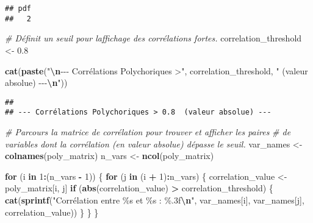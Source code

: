\documentclass[
]{article}
\newenvironment{Shaded}{\begin{snugshade}}{\end{snugshade}}
\newcommand{\CommentTok}[1]{\textcolor[rgb]{0.56,0.35,0.01}{\textit{#1}}}
\newcommand{\ControlFlowTok}[1]{\textcolor[rgb]{0.13,0.29,0.53}{\textbf{#1}}}
\newcommand{\DecValTok}[1]{\textcolor[rgb]{0.00,0.00,0.81}{#1}}
\newcommand{\FloatTok}[1]{\textcolor[rgb]{0.00,0.00,0.81}{#1}}
\newcommand{\FunctionTok}[1]{\textcolor[rgb]{0.13,0.29,0.53}{\textbf{#1}}}
\newcommand{\NormalTok}[1]{#1}
\newcommand{\OtherTok}[1]{\textcolor[rgb]{0.56,0.35,0.01}{#1}}
\newcommand{\SpecialCharTok}[1]{\textcolor[rgb]{0.81,0.36,0.00}{\textbf{#1}}}
\newcommand{\StringTok}[1]{\textcolor[rgb]{0.31,0.60,0.02}{#1}}
\begin{document}
\begin{verbatim}
## pdf 
##   2
\end{verbatim}

\begin{Shaded}
\begin{Highlighting}[]
\CommentTok{\# Définit un seuil pour l\textquotesingle{}affichage des corrélations fortes.}
\NormalTok{correlation\_threshold }\OtherTok{\textless{}{-}} \FloatTok{0.8}

\FunctionTok{cat}\NormalTok{(}\FunctionTok{paste}\NormalTok{(}\StringTok{"}\SpecialCharTok{\textbackslash{}n}\StringTok{{-}{-}{-} Corrélations Polychoriques \textgreater{}"}\NormalTok{, correlation\_threshold, }\StringTok{" (valeur absolue) {-}{-}{-}}\SpecialCharTok{\textbackslash{}n}\StringTok{"}\NormalTok{))}
\end{Highlighting}
\end{Shaded}

\begin{verbatim}
## 
## --- Corrélations Polychoriques > 0.8  (valeur absolue) ---
\end{verbatim}

\begin{Shaded}
\begin{Highlighting}[]
\CommentTok{\# Parcours la matrice de corrélation pour trouver et afficher les paires}
\CommentTok{\# de variables dont la corrélation (en valeur absolue) dépasse le seuil.}
\NormalTok{var\_names }\OtherTok{\textless{}{-}} \FunctionTok{colnames}\NormalTok{(poly\_matrix)}
\NormalTok{n\_vars }\OtherTok{\textless{}{-}} \FunctionTok{ncol}\NormalTok{(poly\_matrix)}

\ControlFlowTok{for}\NormalTok{ (i }\ControlFlowTok{in} \DecValTok{1}\SpecialCharTok{:}\NormalTok{(n\_vars }\SpecialCharTok{{-}} \DecValTok{1}\NormalTok{)) \{}
  \ControlFlowTok{for}\NormalTok{ (j }\ControlFlowTok{in}\NormalTok{ (i }\SpecialCharTok{+} \DecValTok{1}\NormalTok{)}\SpecialCharTok{:}\NormalTok{n\_vars) \{}
\NormalTok{    correlation\_value }\OtherTok{\textless{}{-}}\NormalTok{ poly\_matrix[i, j]}
    \ControlFlowTok{if}\NormalTok{ (}\FunctionTok{abs}\NormalTok{(correlation\_value) }\SpecialCharTok{\textgreater{}}\NormalTok{ correlation\_threshold) \{}
      \FunctionTok{cat}\NormalTok{(}\FunctionTok{sprintf}\NormalTok{(}\StringTok{"Corrélation entre \%s et \%s : \%.3f}\SpecialCharTok{\textbackslash{}n}\StringTok{"}\NormalTok{,}
\NormalTok{                  var\_names[i], var\_names[j], correlation\_value))}
\NormalTok{    \}}
\NormalTok{  \}}
\NormalTok{\}}
\end{Highlighting}
\end{Shaded}
\end{document}
